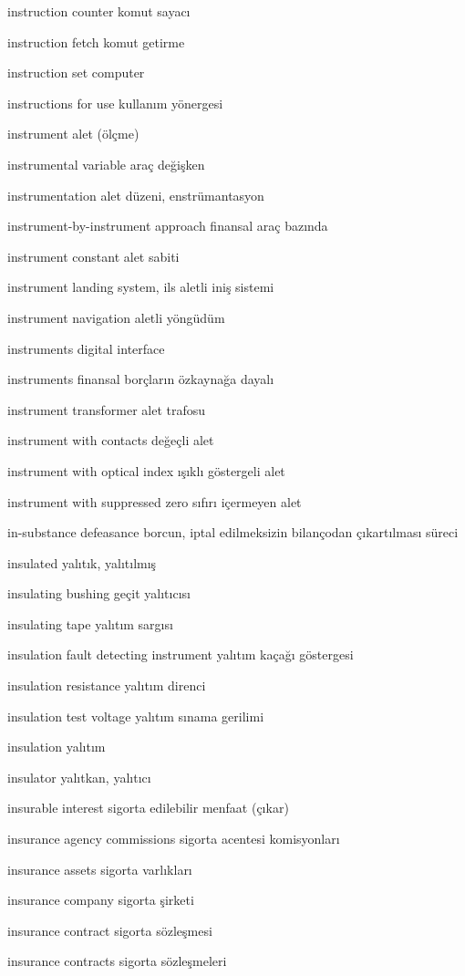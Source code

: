 \documentclass[12pt,fleqn]{article}\usepackage{../../common}
\begin{document}
instruction counter komut sayacı

instruction fetch komut getirme

instruction set computer

instructions for use kullanım yönergesi

instrument alet (ölçme)

instrumental variable araç değişken

instrumentation alet düzeni, enstrümantasyon

instrument-by-instrument approach finansal araç bazında

instrument constant alet sabiti

instrument landing system, ils aletli iniş sistemi

instrument navigation aletli yöngüdüm

instruments digital interface

instruments finansal borçların özkaynağa dayalı

instrument transformer alet trafosu

instrument with contacts değeçli alet

instrument with optical index ışıklı göstergeli alet

instrument with suppressed zero sıfırı içermeyen alet

in-substance defeasance borcun, iptal edilmeksizin bilançodan çıkartılması süreci

insulated yalıtık, yalıtılmış

insulating bushing geçit yalıtıcısı

insulating tape yalıtım sargısı

insulation fault detecting instrument yalıtım kaçağı göstergesi

insulation resistance yalıtım direnci

insulation test voltage yalıtım sınama gerilimi

insulation yalıtım

insulator yalıtkan, yalıtıcı

insurable interest sigorta edilebilir menfaat (çıkar)

insurance agency commissions sigorta acentesi komisyonları

insurance assets sigorta varlıkları

insurance company sigorta şirketi

insurance contract sigorta sözleşmesi

insurance contracts sigorta sözleşmeleri
\end{document}
